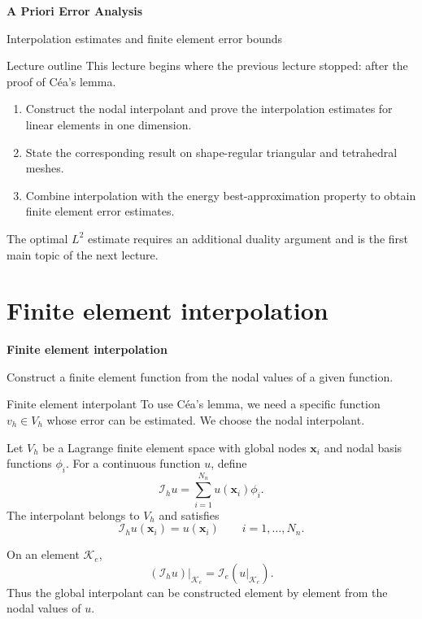 \documentclass[11pt,aspectratio=169]{beamer}
\newcommand{\Ih}{\mathcal I_h}
\newcommand{\Ie}{\mathcal I_e}
\newcommand{\bx}{\bm x}
\begin{document}
\begin{frame}[plain]
  \centering\vfill
  {\LARGE\bfseries A Priori Error Analysis\par}
  \vspace{0.45cm}
  {\large Interpolation estimates and finite element error bounds\par}
  \vfill
\end{frame}

\begin{frame}{Lecture outline}
This lecture begins where the previous lecture stopped: after the proof of
C\'ea's lemma.

\begin{enumerate}
  \item Construct the nodal interpolant and prove the interpolation estimates
  for linear elements in one dimension.
  \item State the corresponding result on shape-regular triangular and
  tetrahedral meshes.
  \item Combine interpolation with the energy best-approximation property to
  obtain finite element error estimates.
\end{enumerate}

The optimal $L^2$ estimate requires an additional duality argument and is the
first main topic of the next lecture.
\end{frame}

\section{Finite element interpolation}

\begin{frame}[plain]
  \centering
  \vfill
  {\LARGE\bfseries Finite element interpolation\par}
  \vspace{0.45cm}
  {\large Construct a finite element function from the nodal values of a
  given function.\par}
  \vfill
\end{frame}

\begin{frame}{Finite element interpolant}
To use C\'ea's lemma, we need a specific function $v_h\in V_h$ whose error
can be estimated. We choose the nodal interpolant.

Let $V_h$ be a Lagrange finite element space with global nodes $\bx_i$ and
nodal basis functions $\phi_i$. For a continuous function $u$, define
\[
  \boxed{
  \Ih u
  =\sum_{i=1}^{N_n}u(\bx_i)\phi_i.}
\]
The interpolant belongs to $V_h$ and satisfies
\[
  \Ih u(\bx_i)=u(\bx_i)
  \qquad i=1,\ldots,N_n.
\]

On an element $\mathcal K_e$,
\[
  (\Ih u)|_{\mathcal K_e}
  =\Ie(u|_{\mathcal K_e}).
\]
Thus the global interpolant can be constructed element by element from the nodal
values of $u$.
\end{frame}
\end{document}
